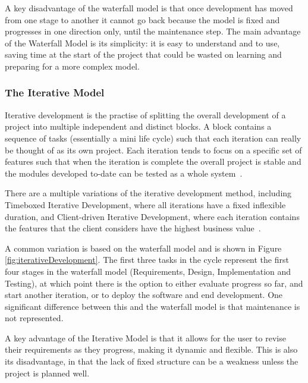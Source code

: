 \documentclass{article}
\begin{document}
A key disadvantage of the waterfall model is that once development has moved from one stage to another it cannot go back because the model is fixed and progresses in one direction only, until the maintenance step.  The main advantage of the Waterfall Model is its simplicity: it is easy to understand and to use, saving time at the start of the project that could be wasted on learning and preparing for a more complex model.

\subsubsection{The Iterative Model}
Iterative development is the practise of splitting the overall development of a project into multiple independent and distinct blocks.  A block contains a sequence of tasks (essentially a mini life cycle) such that each iteration can really be thought of as its own project.  Each iteration tends to focus on a specific set of features such that when the iteration is complete the overall project is stable and the modules developed to-date can be tested as a whole system~\cite{differenceBetweenLifeCycleModels}.

There are a multiple variations of the iterative development method, including Timeboxed Iterative Development, where all iterations have a fixed inflexible duration, and Client-driven Iterative Development, where each iteration contains the features that the client considers have the highest business value~\cite{larman2004agile}.

A common variation is based on the waterfall model and is shown in Figure \ref{fig:iterativeDevelopment}.  The first three tasks in the cycle represent the first four stages in the waterfall model (Requirements, Design, Implementation and Testing), at which point there is the option to either evaluate progress so far, and start another iteration, or to deploy the software and end development.  One significant difference between this and the waterfall model is that maintenance is not represented.

A key advantage of the Iterative Model is that it allows for the user to revise their requirements as they progress, making it dynamic and flexible.  This is also its disadvantage, in that the lack of fixed structure can be a weakness unless the project is planned well.
\end{document}
